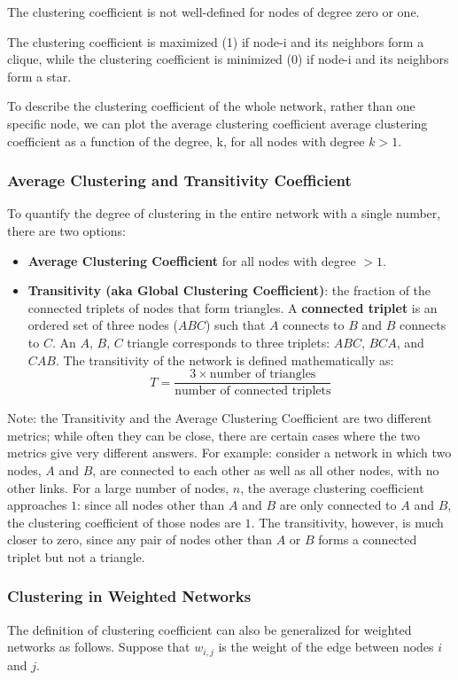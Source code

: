 \documentclass[11pt]{scrartcl} %
\begin{document}
The clustering coefficient is not well-defined for nodes of degree zero or one.

The clustering coefficient is maximized (1) if node-i and its neighbors form a clique, while the clustering coefficient is minimized (0) if node-i and its neighbors form a star.

To describe the clustering coefficient of the whole network, rather than one specific node, we can plot the average clustering coefficient average clustering coefficient as a function of the degree, k, for all nodes with degree $k>1$.

\subsubsection{Average Clustering and Transitivity Coefficient}
To quantify the degree of clustering in the entire network with a single number, there are two options:
\begin{itemize}
	\item \textbf{Average Clustering Coefficient} for all nodes with degree $>1$.
	\item \textbf{Transitivity (aka Global Clustering Coefficient)}: the fraction of the connected triplets of nodes that form triangles. A \textbf{connected triplet} is an ordered set of three nodes ($ABC$) such that $A$ connects to $B$ and $B$ connects to $C$. An $A$, $B$, $C$ triangle corresponds to three triplets: $ABC$, $BCA$, and $CAB$. The transitivity of the network is defined mathematically as:
\[T = \frac{3 \times \text{number of triangles}}{\text{number of connected triplets}}\]
\end{itemize}

Note: the Transitivity and the Average Clustering Coefficient are two different metrics; while often they can be close, there are certain cases where the two metrics give very different answers. For example: consider a network in which two nodes, $A$ and $B$, are connected to each other as well as all other nodes, with no other links. For a large number of nodes, $n$, the average clustering coefficient approaches $1$: since all nodes other than $A$ and $B$ are only connected to $A$ and $B$, the clustering coefficient of those nodes are $1$. The transitivity, however, is much closer to zero, since any pair of nodes other than $A$ or $B$ forms a connected triplet but not a triangle.

\subsubsection{Clustering in Weighted Networks}
The definition of clustering coefficient can also be generalized for weighted networks as follows. Suppose that $w_{i,j}$ is the weight of the edge between nodes $i$ and $j$.
\end{document}
